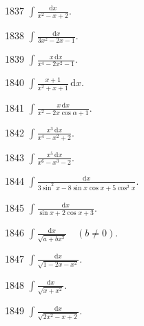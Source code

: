 \begin{prob}[S]{1837}
$\int \frac{\mathrm{d}x}{x^2 - x + 2}$.
\end{prob}

\begin{prob}[S]{1838}
$\int \frac{\mathrm{d}x}{3x^2 - 2x - 1}$.
\end{prob}

\begin{prob}[S]{1839}
$\int \frac{x\,\mathrm{d}x}{x^4 - 2x^2 - 1}$.
\end{prob}

\begin{prob}[S]{1840}
$\int \frac{x + 1}{x^2 + x + 1}\,\mathrm{d}x$.
\end{prob}

\begin{prob}[S]{1841}
$\int \frac{x\,\mathrm{d}x}{x^2 - 2x\cos\alpha + 1}$.
\end{prob}

\begin{prob}[S]{1842}
$\int \frac{x^3\,\mathrm{d}x}{x^4 - x^2 + 2}$.
\end{prob}

\begin{prob}[S]{1843}
$\int \frac{x^5\,\mathrm{d}x}{x^6 - x^3 - 2}$.
\end{prob}

\begin{prob}[S]{1844}
$\int \frac{\mathrm{d}x}{3\sin^2 x - 8\sin x\cos x + 5\cos^2 x}$.
\end{prob}

\begin{prob}[S]{1845}
$\int \frac{\mathrm{d}x}{\sin x + 2\cos x + 3}$.
\end{prob}

\begin{prob}[S]{1846}
$\int \frac{\mathrm{d}x}{\sqrt{a + bx^2}} \quad (b \neq 0)$.
\end{prob}

\begin{prob}[S]{1847}
$\int \frac{\mathrm{d}x}{\sqrt{1 - 2x - x^2}}$.
\end{prob}

\begin{prob}[S]{1848}
$\int \frac{\mathrm{d}x}{\sqrt{x + x^2}}$.
\end{prob}

\begin{prob}[S]{1849}
$\int \frac{\mathrm{d}x}{\sqrt{2x^2 - x + 2}}$.
\end{prob}

